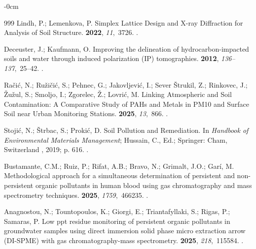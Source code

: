\documentclass[environremediat,article,accept,pdftex,oneauthor]{Definitions/mdpi}
\begin{document}
\begin{adjustwidth}{-\extralength}{0cm}
\begin{thebibliography}{999}
Lindh, P.; Lemenkova, P.
\newblock Simplex Lattice Design and X-ray Diffraction for Analysis of Soil
  Structure.
 {\bf 2022}, {\em 11},~3726.
.

Deceuster, J.; Kaufmann, O.
\newblock Improving the delineation of hydrocarbon-impacted soils and water
  through induced polarization (IP) tomographies.
 {\bf 2012}, {\em
  136--137},~25--42.
.

Ra\v{c}i{\'c}, N.; Ru\v{z}i\v{c}i{\'c}, S.; Pehnec, G.; Jakovljević, I.; Sever Štrukil, Z.; Rinkovec, J.; Žužul, S.; Smoljo, I.; Zgorelec, Ž.; Lovrić, M. 
\newblock Linking Atmospheric and Soil Contamination: A Comparative Study of
  PAHs and Metals in PM10 and Surface Soil near Urban Monitoring Stations.
 {\bf 2025}, {\em 13},~866.
.

Stoji{\'c}, N.; {\v{S}}trbac, S.; Proki{\'c}, D.
\newblock Soil Pollution and Remediation. In {\em Handbook of Environmental
  Materials Management}; Hussain, C., Ed.; Springer: Cham, Switzerland%
, 2019; p. 616.
.

Bustamante, C.M.; Ruiz, P.; Rifat, A.B.; Bravo, N.; Grimalt, J.O.; Gar{\'i}, M.
\newblock Methodological approach for a simultaneous determination of
  persistent and non-persistent organic pollutants in human blood using gas
  chromatography and mass spectrometry techniques.
 {\bf 2025}, {\em 1759},~466235.
.

Anagnostou, N.; Tountopoulos, K.; Giorgi, E.; Triantafyllaki, S.; Rigas, P.;
  Samaras, P.
\newblock Low ppt residue monitoring of persistent organic pollutants in
  groundwater samples using direct immersion solid phase micro extraction arrow
  (DI-SPME) with gas chromatography-mass spectrometry.
 {\bf 2025}, {\em 218},~115584.
.


\end{thebibliography}
\end{adjustwidth}
\end{document}

